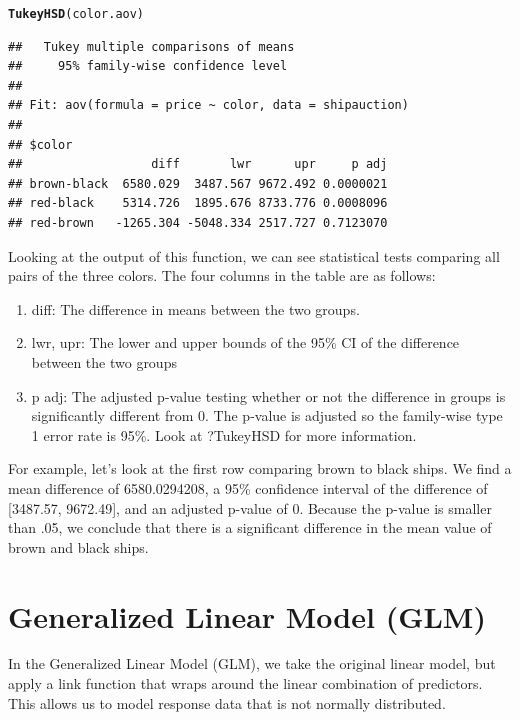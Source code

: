 \documentclass{tufte-book}\usepackage[]{graphicx}\usepackage[]{color}
\makeatletter
\newcommand{\hlstd}[1]{\textcolor[rgb]{0.345,0.345,0.345}{#1}}%
\newcommand{\hlkwd}[1]{\textcolor[rgb]{0.737,0.353,0.396}{\textbf{#1}}}%
\newenvironment{kframe}{%
 \def\at@end@of@kframe{}%
 \ifinner\ifhmode%
  \def\at@end@of@kframe{\end{minipage}}%
  \begin{minipage}{\columnwidth}%
 \fi\fi%
 \def\FrameCommand##1{\hskip\@totalleftmargin \hskip-\fboxsep
 \colorbox{shadecolor}{##1}\hskip-\fboxsep
     \hskip-\linewidth \hskip-\@totalleftmargin \hskip\columnwidth}%
 \MakeFramed {\advance\hsize-\width
   \@totalleftmargin\z@ \linewidth\hsize
   \@setminipage}}%
 {\par\unskip\endMakeFramed%
 \at@end@of@kframe}
\newenvironment{knitrout}{}{} %
\makeatother
\begin{document}
\begin{footnotesize}
\begin{knitrout}
\color{fgcolor}\begin{kframe}
\begin{alltt}
\hlkwd{TukeyHSD}\hlstd{(color.aov)}
\end{alltt}
\begin{verbatim}
##   Tukey multiple comparisons of means
##     95% family-wise confidence level
## 
## Fit: aov(formula = price ~ color, data = shipauction)
## 
## $color
##                  diff       lwr      upr     p adj
## brown-black  6580.029  3487.567 9672.492 0.0000021
## red-black    5314.726  1895.676 8733.776 0.0008096
## red-brown   -1265.304 -5048.334 2517.727 0.7123070
\end{verbatim}
\end{kframe}
\end{knitrout}

Looking at the output of this function, we can see statistical tests comparing all pairs of the three colors. The four columns in the table are as follows:

\begin{enumerate}
  \item diff: The difference in means between the two groups.
  \item lwr, upr: The lower and upper bounds of the 95\% CI of the difference between the two groups
  \item p adj: The adjusted p-value testing whether or not the difference in groups is significantly different from 0. The p-value is adjusted so the family-wise type 1 error rate is 95\%. Look at ?TukeyHSD for more information.
\end{enumerate}

For example, let's look at the first row comparing brown to black ships. We find a mean difference of 6580.0294208, a 95\% confidence interval of the difference of [3487.57, 9672.49], and an adjusted p-value of 0. Because the p-value is smaller than .05, we conclude that there is a significant difference in the mean value of brown and black ships.

\section{Generalized Linear Model (GLM)}

In the Generalized Linear Model (GLM), we take the original linear model, but apply a link function that wraps around the linear combination of predictors. This allows us to model response data that is not normally distributed.



\end{footnotesize}
\end{document}
